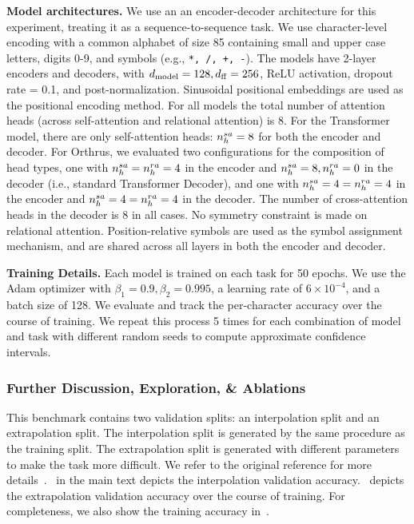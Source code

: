 \textbf{Model architectures.} We use an an encoder-decoder architecture for this experiment, treating it as a sequence-to-sequence task. We use character-level encoding with a common alphabet of size 85 containing small and upper case letters, digits 0-9, and symbols (e.g., \texttt{*, /, +, -}). The models have 2-layer encoders and decoders, with $d_{\mathrm{model}} = 128, d_{\mathrm{ff}} = 256$, ReLU activation, dropout rate = 0.1, and post-normalization. Sinusoidal positional embeddings are used as the positional encoding method. For all models the total number of attention heads (across self-attention and relational attention) is $8$. For the Transformer model, there are only self-attention heads: $n_h^{sa} = 8$ for both the encoder and decoder. For Orthrus, we evaluated two configurations for the composition of head types, one with $n_h^{sa} = n_h^{ra} = 4$ in the encoder and $n_h^{sa} = 8, n_h^{ra} = 0$ in the decoder (i.e., standard Transformer Decoder), and one with $n_h^{sa} = 4 = n_h^{ra} = 4$ in the encoder and $n_h^{sa} = 4 = n_h^{ra} = 4$ in the decoder. The number of cross-attention heads in the decoder is $8$ in all cases. No symmetry constraint is made on relational attention. Position-relative symbols are used as the symbol assignment mechanism, and are shared across all layers in both the encoder and decoder.

\textbf{Training Details.} Each model is trained on each task for 50 epochs. We use the Adam optimizer with $\beta_1 = 0.9, \beta_2 = 0.995$, a learning rate of $6 \times 10^{-4}$, and a batch size of 128. We evaluate and track the per-character accuracy over the course of training. We repeat this process 5 times for each combination of model and task with different random seeds to compute approximate confidence intervals.

\subsubsection*{Further Discussion, Exploration, \& Ablations}

This benchmark contains two validation splits: an interpolation split and an extrapolation split. The interpolation split is generated by the same procedure as the training split. The extrapolation split is generated with different parameters to make the task more difficult. We refer to the original reference for more details~\citep{saxtonAnalyzingMathematicalReasoning2019}.~ in the main text depicts the interpolation validation accuracy.~ depicts the extrapolation validation accuracy over the course of training. For completeness, we also show the training accuracy in~.

